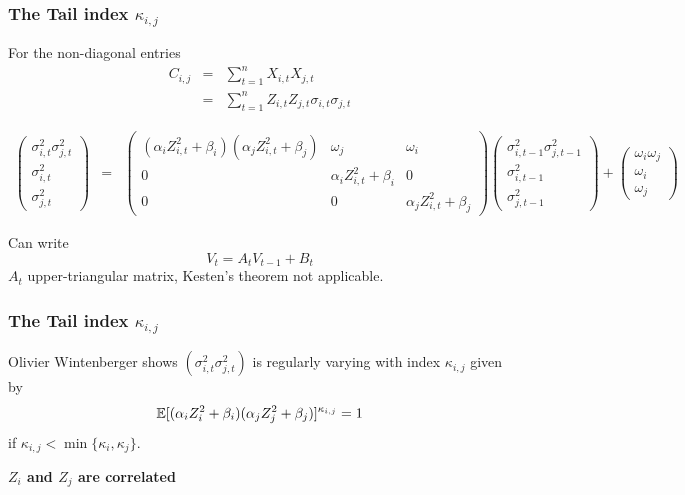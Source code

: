 \documentclass{beamer}
\begin{document}
  \begin{frame}
  \frametitle{The Tail index $\kappa_{i,j}$}
    For the non-diagonal entries
    \begin{eqnarray*}
      C_{i, j} &=& \sum_{t=1}^n X_{i, t} X_{j, t} \\
      &=& \sum_{t=1}^n Z_{i, t} Z_{j, t} \sigma_{i, t} \sigma_{j, t}
    \end{eqnarray*}

    \begin{tiny}
      \begin{eqnarray*}
        \begin{pmatrix}
          \sigma_{i,t}^2 \sigma_{j,t}^2 \\
          \sigma_{i,t}^2 \\
          \sigma_{j,t}^2
        \end{pmatrix}
        &=&
        \begin{pmatrix}
          (\alpha_i Z_{i,t}^2 + \beta_i) (\alpha_j Z_{i,t}^2 + \beta_j) & \omega_j & \omega_i \\
          0 & \alpha_i Z_{i,t}^2 + \beta_i & 0 \\
          0 & 0 & \alpha_j Z_{i,t}^2 + \beta_j
        \end{pmatrix}
        \begin{pmatrix}
          \sigma_{i,t-1}^2 \sigma_{j,t-1}^2 \\
          \sigma_{i,t-1}^2 \\
          \sigma_{j,t-1}^2
        \end{pmatrix} +
        \begin{pmatrix}
          \omega_i \omega_j\\
          \omega_i \\
          \omega_j
        \end{pmatrix}
      \end{eqnarray*}
    \end{tiny}
    Can write
    \[
    V_t = A_t V_{t-1} + B_t
    \]
    $A_t$ upper-triangular matrix, Kesten's theorem not applicable.
  \end{frame}

  \begin{frame}
    \frametitle{The Tail index $\kappa_{i,j}$}
    Olivier Wintenberger shows $(\sigma_{i,t}^2 \sigma_{j,t}^2)$ is regularly
    varying with index $\kappa_{i,j}$ given by
    \[
    \mathbb{E} [(\alpha_i Z_i^2 + \beta_i)(\alpha_j Z_j^2 + \beta_j)]^{\kappa_{i,j}} = 1
    \]
    if $\kappa_{i,j} < \min\{\kappa_i, \kappa_j\}$.

    {\bf $Z_i$ and $Z_j$ are correlated}
  \end{frame}
\end{document}
